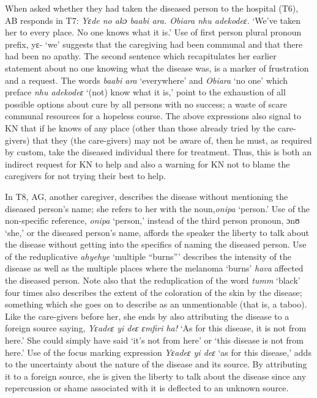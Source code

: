 \documentclass[output=paper,colorlinks,citecolor=brown]{langscibook}
\begin{document}
When asked whether they had taken the diseased person to the hospital (T6), AB responds in T7:
\textit{Yɛde no akɔ baabi ara. Obiara nhu adekodeɛ.} ‘We’ve taken her to every place. No one knows what it is.’ Use of first person plural pronoun prefix, yɛ- ‘we’ suggests that the caregiving had been communal and that there had been no apathy. The second sentence which recapitulates her earlier statement about no one knowing what the disease was, is a marker of frustration and a request. The words \textit{baabi ara }‘everywhere’ and \textit{Obiara} ‘no one’ which preface \textit{nhu adekodeɛ} ‘(not) know what it is,’ point to the exhaustion of all possible options about cure by all persons with no success; a waste of scare communal resources for a hopeless course. The above expressions also signal to KN that if he knows of any place (other than those already tried by the care-givers) that they (the care-givers) may not be aware of, then he must, as required by custom, take the diseased individual there for treatment. Thus, this is both an indirect request for KN to help and also a warning for KN not to blame the caregivers for not trying their best to help.

In T8, AG, another caregiver, describes the disease without mentioning the diseased person’s name; she refers to her with the noun,\textit{onipa} ‘person.’ Use of the non-specific reference, \textit{onipa} ‘person,’ instead of the third person pronoun, ɔnʊ ‘she,’ or the diseased person’s name, affords the speaker the liberty to talk about the disease without getting into the specifics of naming the diseased person. Use of the reduplicative \textit{ahyehye} ‘multiple “burns”’ describes the intensity of the disease as well as the multiple places where the melanoma ‘burns’ \textit{hava} affected the diseased person. Note also that the reduplication of the word \textit{tumm} ‘black’ four times also describes the extent of the coloration of the skin by the disease; something which she goes on to describe as an unmentionable (that is, a taboo). Like the care-givers before her, she ends by also attributing the disease to a foreign source saying, \textit{Yɛadeɛ yi deɛ ɛmfiri ha!} ‘As for this disease, it is not from here.’ She could simply have said ‘it’s not from here’ or ‘this disease is not from here.’ Use of the focus marking expression \textit{Yɛadeɛ yi deɛ } ‘as for this disease,’ adds to the uncertainty about the nature of the disease and its source. By attributing it to a foreign source, she is given the liberty to talk about the disease since any repercussion or shame associated with it is deflected to an unknown source.
\end{document}
